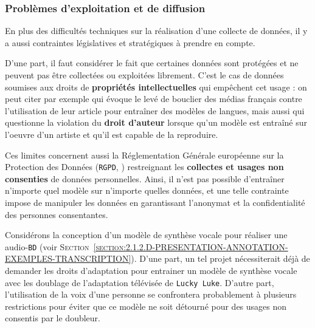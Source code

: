 		
		\subsubsection{Problèmes d'exploitation et de diffusion}
		\label{section:2.3.1.C-DEFIS-ANNOTATION-ASPECT-DONNEES-DROITS}
		
			En plus des difficultés techniques sur la réalisation d'une collecte de données, il y a aussi contraintes législatives et stratégiques à prendre en compte.
			
			D'une part, il faut considérer le fait que certaines données sont protégées et ne peuvent pas être collectées ou exploitées librement.
			C'est le cas de données soumises aux droits de \textbf{propriétés intellectuelles} qui empêchent cet usage : on peut citer par exemple \cite{loignon:2023:ia-medias-francais} qui évoque le levé de bouclier des médias français contre l'utilisation de leur article pour entraîner des modèles de langues, mais aussi \cite{les-echos:2023:ia-auteur-game} qui questionne la violation du \textbf{droit d'auteur} lorsque qu'un modèle est entraîné sur l'oeuvre d'un artiste et qu'il est capable de la reproduire.
			
			Ces limites concernent aussi la Réglementation Générale européenne sur la Protection des Données (\texttt{RGPD}, \cite{european-commission:2016:regulation-eu-2016}) restreignant les \textbf{collectes et usages non consenties} de données personnelles.
			Ainsi, il n'est pas possible d’entraîner n'importe quel modèle sur n'importe quelles données, et une telle contrainte impose de manipuler les données en garantissant l'anonymat et la confidentialité des personnes consentantes.
			
			\begin{leftBarExamples}
				Considérons la conception d'un modèle de synthèse vocale pour réaliser une audio-\texttt{BD} (voir \textsc{Section~\ref{section:2.1.2.D-PRESENTATION-ANNOTATION-EXEMPLES-TRANSCRIPTION}}).
				D'une part, un tel projet nécessiterait déjà de demander les droits d'adaptation pour entrainer un modèle de synthèse vocale avec les doublage de l'adaptation télévisée de \texttt{Lucky Luke}.
				D'autre part, l'utilisation de la voix d'une personne se confrontera probablement à plusieurs restrictions pour éviter que ce modèle ne soit détourné pour des usages non consentis par le doubleur.
			\end{leftBarExamples}
			
